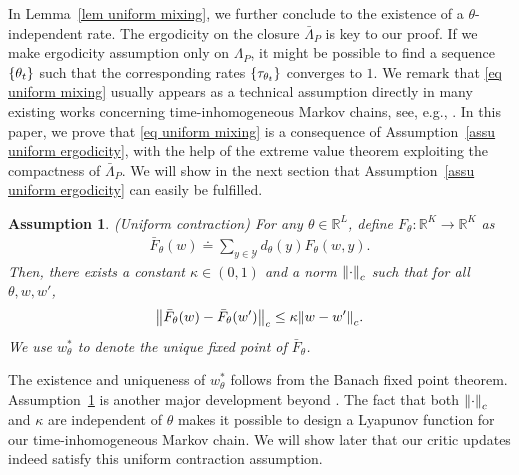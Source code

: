 \documentclass[twoside,11pt]{article}
\newcommand{\fY}{\mathcal{Y}}
\newcommand{\R}{\mathbb{R}}
\newcounter{assucounter}
\numberwithin{assucounter}{section}
\newtheorem{assumption}[assucounter]{Assumption}
\begin{document}
In Lemma~\ref{lem uniform mixing},
we further conclude to the existence of a $\theta$-independent rate.
The ergodicity on the closure $\bar \Lambda_P$ is key to our proof.
If we make ergodicity assumption only on $\Lambda_P$, 
it might be possible to find a sequence $\qty{\theta_t}$ such that the corresponding rates $\qty{\tau_{\theta_t}}$ converges to $1$.
We remark that \eqref{eq uniform mixing} usually appears as a technical assumption directly in many existing works concerning time-inhomogeneous Markov chains, see, e.g., \citet{zou2019finite,wu2020finite}.
In this paper, 
we prove that \eqref{eq uniform mixing} is a consequence of Assumption~\ref{assu uniform ergodicity},
with the help of the extreme value theorem exploiting the compactness of $\bar \Lambda_P$.
We will show in the next section that Assumption~\ref{assu uniform ergodicity} can easily be fulfilled.

\begin{assumption}
    \label{assu uniform contraction}
(Uniform contraction)
For any $\theta \in \R^L$,
define $F_\theta: \R^K \to \R^K$ as 
\begin{align}
    \bar F_\theta(w) \doteq \sum_{y \in \fY} d_\theta(y) F_\theta(w, y).
\end{align}
Then, there exists a constant $\kappa \in (0, 1)$ and a norm $\norm{\cdot}_c$ such that for all $\theta, w, w'$,
\begin{align}
    \norm{\bar F_\theta(w) - \bar F_{\theta}(w')}_c \leq \kappa \norm{w - w'}_c.
\end{align}
We use $w_\theta^*$ to denote the unique fixed point of $\bar F_\theta$.
\end{assumption}
The existence and uniqueness of $w_\theta^*$ follows from the Banach fixed point theorem. 
Assumption~\ref{assu uniform contraction} is another major development beyond \citet{chen2021lyapunov}.
The fact that both $\norm{\cdot}_c$ and $\kappa$ are independent of $\theta$ makes it possible to design a Lyapunov function for our time-inhomogeneous Markov chain.
We will show later that our critic updates indeed satisfy this uniform contraction assumption.
\end{document}
